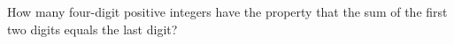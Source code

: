 How many four-digit positive integers have the property that the sum of the first two digits equals the last digit?
